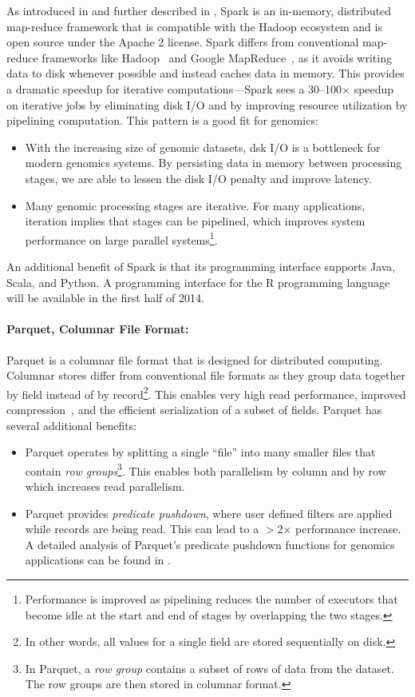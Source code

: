 \documentclass{bioinfo}
\begin{document}
As introduced in \citet{zaharia10} and further described in \citet{zaharia12}, Spark is an in-memory, distributed map-reduce framework that is
compatible with the Hadoop ecosystem and is open source under the Apache 2 license. Spark differs from conventional map-reduce frameworks
like Hadoop~\citep{hadoop} and Google MapReduce~\citep{dean08}, as it avoids writing data to disk whenever possible and instead caches
data in memory. This provides a dramatic speedup for iterative computations---Spark sees a 30--100$\times$ speedup on iterative jobs by eliminating
disk I/O and by improving resource utilization by pipelining computation. This pattern is a good fit for genomics:

\begin{itemize}
\item With the increasing size of genomic datasets, dsk I/O is a bottleneck for modern genomics systems. By persisting data in memory between processing stages,
we are able to lessen the disk I/O penalty and improve latency.
\item Many genomic processing stages are iterative. For many applications, iteration implies that stages can be pipelined, which improves system performance on large
parallel systems\footnote{Performance is improved as pipelining reduces the number of executors that become idle at the start and end of stages by overlapping the
two stages.}. 
\end{itemize}

An additional benefit of Spark is that its programming interface supports Java, Scala, and Python. A programming interface for the R programming language will
be available in the first half of 2014.

\paragraph{Parquet, Columnar File Format:}
\label{sec:parquet}

Parquet is a columnar file format that is designed for distributed computing. Columnar stores differ from conventional file formats as they group data together
by field instead of by record\footnote{In other words, all values for a single field are stored sequentially on disk.}. This enables very high read performance, improved
compression~\citep[see][]{abadi06}, and the efficient serialization of a subset of fields. Parquet has several additional benefits:

\begin{itemize}
\item Parquet operates by splitting a single ``file'' into many smaller files that contain \emph{row groups}\footnote{In Parquet, a \emph{row group} contains a subset
of rows of data from the dataset. The row groups are then stored in columnar format.}. This enables both parallelism by column and by row which increases read parallelism.
\item Parquet provides \emph{predicate pushdown}, where user defined filters are applied while records are being read. This can lead to a $>$2$\times$ performance increase.
A detailed analysis of Parquet's predicate pushdown functions for genomics applications can be found in \citet{massie13}.
\end{itemize}
\end{document}
